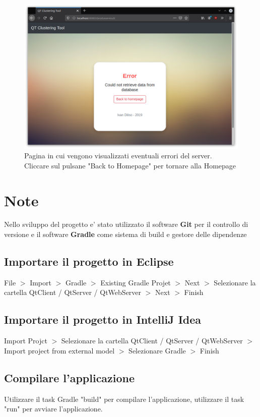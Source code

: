 \documentclass{article}
\begin{document}
    \begin{figure}[H]
        \includegraphics[scale=0.4]{ADDON8}
        \caption{Pagina in cui vengono visualizzati eventuali errori del 
        server. Cliccare sul pulsane "Back to Homepage" per tornare alla 
        Homepage}   
        \label{fig:12}
    \end{figure} 


    \section{Note}
    Nello sviluppo del progetto e' stato utilizzato il software 
    \textbf{Git} per il controllo di versione e il software 
    \textbf{Gradle} come sistema di build e gestore delle dipendenze
        \subsection{Importare il progetto in Eclipse}
        File $>$ Import $>$ Gradle $>$ Existing Gradle Projet $>$ Next $>$
        Selezionare la cartella QtClient / QtServer / QtWebServer $>$ Next $>$
        Finish
        \subsection{Importare il progetto in IntelliJ  Idea}
        Import Projct $>$
         Selezionare la cartella QtClient / QtServer / QtWebServer 
         $>$
        Import project from external model $>$ Selezionare Gradle $>$ Finish 

        \subsection{Compilare l'applicazione}
        Utilizzare il task Gradle "build" per compilare l'applicazione, 
        utilizzare il task "run" per avviare l'applicazione.
\end{document}
